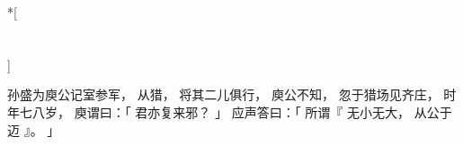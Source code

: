 
\switchcolumn[0]*[\section{}]

孙盛为庾公记室参军，
从猎，
将其二儿俱行，
庾公不知，
忽于猎场见齐庄，
时年七八岁，
庾谓曰：「
    君亦复来邪？
」
应声答曰：「
    所谓『
        无小无大，
        从公于迈
    』。
」

\switchcolumn


